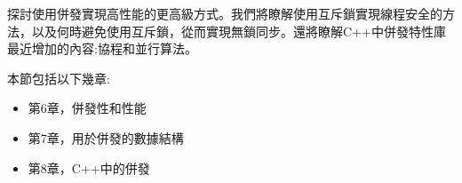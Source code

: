 探討使用併發實現高性能的更高級方式。我們將瞭解使用互斥鎖實現線程安全的方法，以及何時避免使用互斥鎖，從而實現無鎖同步。還將瞭解C++中併發特性庫最近增加的內容:協程和並行算法。

本節包括以下幾章:

\begin{itemize}
\item 第6章，併發性和性能
\item 第7章，用於併發的數據結構
\item 第8章，C++中的併發
\end{itemize}

